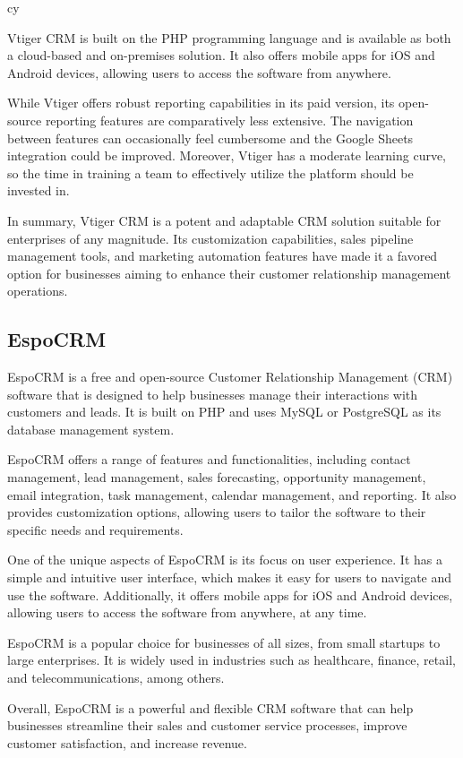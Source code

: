 cy\documentclass{article}
\begin{document}
Vtiger CRM is built on the PHP programming language and is available as both a cloud-based and on-premises solution. It also offers mobile apps for iOS and Android devices, allowing users to access the software from anywhere.

While Vtiger offers robust reporting capabilities in its paid version, its open-source reporting features are comparatively less extensive. The navigation between features can occasionally feel cumbersome and the Google Sheets integration could be improved. Moreover, Vtiger has a moderate learning curve, so the time in training a team to effectively utilize the platform should be invested in.

In summary, Vtiger CRM is a potent and adaptable CRM solution suitable for enterprises of any magnitude. Its customization capabilities, sales pipeline management tools, and marketing automation features have made it a favored option for businesses aiming to enhance their customer relationship management operations.

\subsection{EspoCRM}

EspoCRM is a free and open-source Customer Relationship Management (CRM) software that is designed to help businesses manage their interactions with customers and leads. It is built on PHP and uses MySQL or PostgreSQL as its database management system.

EspoCRM offers a range of features and functionalities, including contact management, lead management, sales forecasting, opportunity management, email integration, task management, calendar management, and reporting. It also provides customization options, allowing users to tailor the software to their specific needs and requirements.

One of the unique aspects of EspoCRM is its focus on user experience. It has a simple and intuitive user interface, which makes it easy for users to navigate and use the software. Additionally, it offers mobile apps for iOS and Android devices, allowing users to access the software from anywhere, at any time.

EspoCRM is a popular choice for businesses of all sizes, from small startups to large enterprises. It is widely used in industries such as healthcare, finance, retail, and telecommunications, among others.

Overall, EspoCRM is a powerful and flexible CRM software that can help businesses streamline their sales and customer service processes, improve customer satisfaction, and increase revenue.
\end{document}
